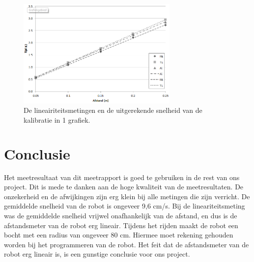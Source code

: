 \documentclass{report}
\begin{document}
\begin{figure}[H]
	\centering
	\includegraphics[width=0.7\textwidth]{lineairiteit}
	\caption{De lineairiteitsmetingen en de uitgerekende snelheid van de kalibratie in 1 grafiek.}
	\label{fig:linGraph}
\end{figure}

\newpage
\chapter{Conclusie}
Het meetresultaat van dit meetrapport is goed te gebruiken in de rest van ons project. Dit is mede te danken aan de hoge kwaliteit van de meetresultaten. De onzekerheid en de afwijkingen zijn erg klein bij alle metingen die zijn verricht. De gemiddelde snelheid van de robot is ongeveer 9,6 cm/s. Bij de lineariteitsmeting was de gemiddelde snelheid vrijwel onafhankelijk van de afstand, en dus is de afstandsmeter van de robot erg lineair. Tijdens het rijden maakt de robot een bocht met een radius van ongeveer 80 cm. Hiermee moet rekening gehouden worden bij het programmeren van de robot. Het feit dat de afstandsmeter van de robot erg lineair is, is een gunstige conclusie voor ons project.
\end{document}
